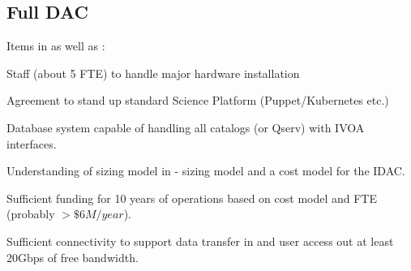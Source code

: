 \subsection{Full DAC} \label{sec:fullDAC}
Items in  as well as :
\begin{todolist}
\item Staff (about 5 FTE) to handle major hardware installation
\item Agreement to stand up standard Science Platform (Puppet/Kubernetes etc.)
\item Database system capable of handling all catalogs (or Qserv) with IVOA  interfaces.
\item Understanding of sizing model in  - sizing model and a cost model for the IDAC.
\item Sufficient funding for 10 years of operations  based on cost model and FTE (probably $>\$6M/year$).
\item Sufficient connectivity to support data transfer in and user access out at least 20Gbps of free bandwidth.
\end{todolist}
